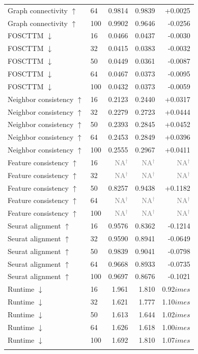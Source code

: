 \documentclass[10pt]{article}
\begin{document}
\begin{landscape}
\begin{longtable}{@{}llrrr@{}}
Graph connectivity $\uparrow$ & 64 & 0.9814 & 0.9839 & +0.0025 \\
Graph connectivity $\uparrow$ & 100 & 0.9902 & 0.9646 & -0.0256 \\
\addlinespace
FOSCTTM $\downarrow$ & 16 & 0.0466 & 0.0437 & -0.0030 \\
FOSCTTM $\downarrow$ & 32 & 0.0415 & 0.0383 & -0.0032 \\
FOSCTTM $\downarrow$ & 50 & 0.0449 & 0.0361 & -0.0087 \\
FOSCTTM $\downarrow$ & 64 & 0.0467 & 0.0373 & -0.0095 \\
FOSCTTM $\downarrow$ & 100 & 0.0432 & 0.0373 & -0.0059 \\
\addlinespace
Neighbor consistency $\uparrow$ & 16 & 0.2123 & 0.2440 & +0.0317 \\
Neighbor consistency $\uparrow$ & 32 & 0.2279 & 0.2723 & +0.0444 \\
Neighbor consistency $\uparrow$ & 50 & 0.2393 & 0.2845 & +0.0452 \\
Neighbor consistency $\uparrow$ & 64 & 0.2453 & 0.2849 & +0.0396 \\
Neighbor consistency $\uparrow$ & 100 & 0.2555 & 0.2967 & +0.0411 \\
\addlinespace
Feature consistency $\uparrow$ & 16 & \textcolor{gray}{NA$^{\dagger}$} & \textcolor{gray}{NA$^{\dagger}$} & \textcolor{gray}{NA$^{\dagger}$} \\
Feature consistency $\uparrow$ & 32 & \textcolor{gray}{NA$^{\dagger}$} & \textcolor{gray}{NA$^{\dagger}$} & \textcolor{gray}{NA$^{\dagger}$} \\
Feature consistency $\uparrow$ & 50 & 0.8257 & 0.9438 & +0.1182 \\
Feature consistency $\uparrow$ & 64 & \textcolor{gray}{NA$^{\dagger}$} & \textcolor{gray}{NA$^{\dagger}$} & \textcolor{gray}{NA$^{\dagger}$} \\
Feature consistency $\uparrow$ & 100 & \textcolor{gray}{NA$^{\dagger}$} & \textcolor{gray}{NA$^{\dagger}$} & \textcolor{gray}{NA$^{\dagger}$} \\
\addlinespace
Seurat alignment $\uparrow$ & 16 & 0.9576 & 0.8362 & -0.1214 \\
Seurat alignment $\uparrow$ & 32 & 0.9590 & 0.8941 & -0.0649 \\
Seurat alignment $\uparrow$ & 50 & 0.9839 & 0.9041 & -0.0798 \\
Seurat alignment $\uparrow$ & 64 & 0.9668 & 0.8933 & -0.0735 \\
Seurat alignment $\uparrow$ & 100 & 0.9697 & 0.8676 & -0.1021 \\
\addlinespace
Runtime $\downarrow$ & 16 & 1.961 & 1.810 & 0.92$	imes$ \\
Runtime $\downarrow$ & 32 & 1.621 & 1.777 & 1.10$	imes$ \\
Runtime $\downarrow$ & 50 & 1.613 & 1.644 & 1.02$	imes$ \\
Runtime $\downarrow$ & 64 & 1.626 & 1.618 & 1.00$	imes$ \\
Runtime $\downarrow$ & 100 & 1.692 & 1.810 & 1.07$	imes$ \\
\addlinespace
\bottomrule\end{longtable}\end{landscape}
\end{document}
